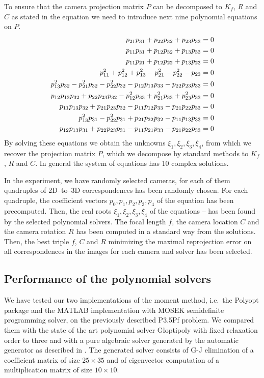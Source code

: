 To ensure that the camera projection matrix $P$ can be decomposed to $K_f$, $R$ and $C$ as stated in the equation  we need to introduce next nine polynomial equations on $P$.
\begin{align}
  p_{21}p_{31} + p_{22}p_{32} + p_{23}p_{33} &= 0 \labeleq{app:P35Pf:eqs1}\\
  p_{11}p_{31} + p_{12}p_{32} + p_{13}p_{33} &= 0\\
  p_{11}p_{21} + p_{12}p_{22} + p_{13}p_{23} &= 0\\
  p_{11}^2 + p_{12}^2 + p_{13}^2 - p_{21}^2 - p_{22}^2 - p_{23} &= 0\\
  p_{13}^2p_{32} - p_{21}^2p_{32} - p_{22}^2p_{32} - p_{12}p_{13}p_{33} - p_{22}p_{23}p_{33} &= 0\\
  p_{12}p_{13}p_{32} + p_{22}p_{23}p_{32} - p_{12}^2p_{33} + p_{21}^2p_{33} + p_{23}^2p_{33} &= 0\\
  p_{11}p_{13}p_{32} + p_{21}p_{23}p_{32} - p_{11}p_{12}p_{33} - p_{21}p_{22}p_{33} &= 0\\
  p_{13}^2p_{31} - p_{22}^2p_{31} + p_{21}p_{22}p_{32} - p_{11}p_{13}p_{33} &= 0\\
  p_{12}p_{13}p_{31} + p_{22}p_{23}p_{31} - p_{11}p_{21}p_{33} - p_{21}p_{22}p_{33} &= 0 \labeleq{app:P35Pf:eqs9}
\end{align}
By solving these equations we obtain the unknowns $\xi_1, \xi_2, \xi_3, \xi_4$, from which we recover the projection matrix $P$, which we decompose by standard methods to $K_f$, $R$ and $C$.
In general the system of equations has 10 complex solutions.

In the experiment, we have randomly selected \importAppPPPfNumCameras{} cameras, for each of them \importAppPPPfNumPoints{} quadruples of 2D--to--3D correspondences has been randomly chosen.
For each quadruple, the coefficient vectors $p_0, p_1, p_2, p_3, p_4$ of the equation  has been precomputed.
Then, the real roots $\xi_1, \xi_2, \xi_3, \xi_4$ of the equations  --  has been found by the selected polynomial solvers.
The focal length $f$, the camera location $C$ and the camera rotation $R$ has been computed in a standard way from the solutions.
Then, the best triple $f$, $C$ and $R$ minimizing the maximal reprojection error on all correspondences in the images for each camera and solver has been selected.

\subsection{Performance of the polynomial solvers}
We have tested our two implementations of the moment method, i.e.\ the Polyopt package and the MATLAB implementation with MOSEK semidefinite programming solver, on the previously described P3.5Pf problem.
We compared them with the state of the art polynomial solver Gloptipoly with fixed relaxation order to three and with a pure algebraic solver generated by the automatic generator \cite{autogen} as described in \cite{P35Pf}.
The generated solver consists of G-J elimination of a coefficient matrix of size $25 \times 35$ and of eigenvector computation of a multiplication matrix of size $10 \times 10$.

